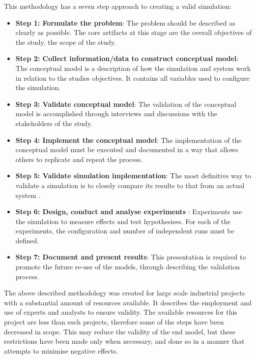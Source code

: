 This methodology has a seven step approach to creating a valid simulation:
\begin{itemize}
  \item \textbf{Step 1: Formulate the problem}: %
	The problem should be described as clearly as possible.
	The core artifacts at this stage are the overall objectives of the study, the scope of the study.
\item \textbf{Step 2: Collect information/data to construct conceptual model}: %
	The conceptual model is a description of how the simulation and system work in relation to the studies objectives.
	It contains all variables used to configure the simulation. 
\item \textbf{Step 3: Validate conceptual model}: %
	The validation of the conceptual model is accomplished through interviews and discussions with the stakeholders of the study.
\item \textbf {Step 4: Implement the conceptual model}: %
	The implementation of the conceptual model must be executed and documented in a way that allows others to replicate and repeat the process.
\item \textbf{Step 5: Validate simulation implementation}: %
	The most definitive way to validate a simulation is to closely compare its results to that from an actual system \citep{Law2005}.
\item \textbf{Step 6: Design, conduct and analyse experiments} :
	Experiments use the simulation to measure effects and test hypothesises. 
	For each of the experiments, the configuration and number of independent runs must be defined.
\item \textbf{Step 7: Document and present results}:
	This presentation is required to promote the future re-use of the models, through describing the validation process.
\end{itemize}

The above described methodology was created for large scale industrial projects with a substantial amount of resources available.
It describes the employment and use of experts and analysts to ensure validity.
The available resources for this project are less than such projects, therefore some of the steps have been decreased in scope.
This may reduce the validity of the end model, but these restrictions have been made only when necessary,
and done so in a manner that attempts to minimise negative effects.

